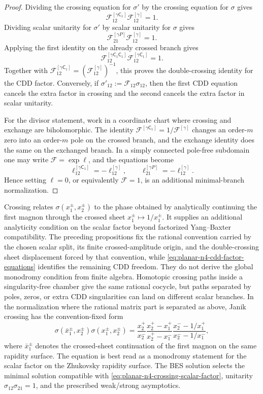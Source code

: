 \begin{proof}
Dividing the crossing equation for \(\sigma'\) by the crossing equation for
\(\sigma\) gives
\[
  \mathcal F^{[\gamma\mathsf C_1]}_{12}
  \mathcal F^{[\gamma]}_{12}=1.
\]
Dividing scalar unitarity for \(\sigma'\) by scalar unitarity for
\(\sigma\) gives
\[
  \mathcal F^{[\gamma P]}_{21}
  \mathcal F^{[\gamma]}_{12}=1.
\]
Applying the first identity on the already crossed branch gives
\[
  \mathcal F^{[\gamma\mathsf C_1\mathsf C_1]}_{12}
  \mathcal F^{[\gamma\mathsf C_1]}_{12}=1.
\]
Together with \(\mathcal F^{[\gamma\mathsf C_1]}_{12}
=(\mathcal F^{[\gamma]}_{12})^{-1}\), this proves the double-crossing
identity for the CDD factor.  Conversely, if
\(\sigma'_{12}:=\mathcal F_{12}\sigma_{12}\), then the first CDD equation
cancels the extra factor in crossing and the second cancels the extra factor
in scalar unitarity.

For the divisor statement, work in a coordinate chart where crossing and
exchange are biholomorphic.  The identity
\(\mathcal F^{[\gamma\mathsf C_1]}=1/\mathcal F^{[\gamma]}\) changes an
order-\(m\) zero into an order-\(m\) pole on the crossed branch, and the
exchange identity does the same on the exchanged branch.  In a simply
connected pole-free subdomain one may write
\(\mathcal F=\exp \ell\), and the equations become
\[
  \ell^{[\gamma\mathsf C_1]}_{12}=-\ell^{[\gamma]}_{12},
  \qquad
  \ell^{[\gamma P]}_{21}=-\ell^{[\gamma]}_{12}.
\]
Hence setting \(\ell=0\), or equivalently \(\mathcal F=1\), is an additional
minimal-branch normalization.
\end{proof}

Crossing relates \(\sigma(x_1^\pm,x_2^\pm)\) to the phase obtained by
analytically continuing the first magnon through the crossed sheet
\(x_1^\pm\mapsto1/x_1^\pm\).  It supplies an additional analyticity condition
on the scalar factor beyond factorized Yang--Baxter compatibility.
The preceding propositions fix the rational convention carried by the
chosen scalar split, its finite crossed-amplitude origin, and the
double-crossing sheet displacement forced by that convention, while
\eqref{eq:planar-n4-cdd-factor-equations} identifies the remaining
CDD freedom.  They do not derive the global monodromy condition from finite
algebra.  Homotopic crossing paths inside a singularity-free chamber give
the same rational cocycle, but paths separated by poles, zeros, or extra CDD
singularities can land on different scalar branches.  In the
normalization where the rational matrix part is separated as
above, Janik crossing has the convention-fixed form
\begin{equation}
  \sigma(\bar x_1^\pm,x_2^\pm)\sigma(x_1^\pm,x_2^\pm)
  =
  \frac{x_2^+}{x_2^-}
  \frac{x_2^+ -x_1^+}{x_2^+ -x_1^-}
  \frac{x_2^- -1/x_1^+}{x_2^- -1/x_1^-} ,
  \label{eq:planar-n4-crossing-scalar-factor}
\end{equation}
where \(\bar x_1^\pm\) denotes the crossed-sheet continuation of the first
magnon on the same rapidity surface.  The equation is best read as a monodromy
statement for the scalar factor on the
Zhukovsky rapidity surface.  The BES solution selects the minimal solution
compatible with \eqref{eq:planar-n4-crossing-scalar-factor}, unitarity
\(\sigma_{12}\sigma_{21}=1\), and the prescribed weak/strong asymptotics.

